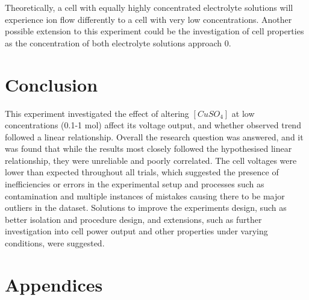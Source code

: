 \documentclass[10.5pt,a4paper]{article}
\begin{document}
Theoretically, a cell with equally highly concentrated electrolyte solutions will experience ion flow differently to a cell with very low concentrations. Another possible extension to this experiment could be the investigation of cell properties as the concentration of both electrolyte solutions approach $0$.
	




\section{Conclusion}
This experiment investigated the effect of altering $[CuSO_4]$ at low concentrations (0.1-1 mol) affect its voltage output, and whether observed trend followed a linear relationship.  Overall the research question was answered, and it was found that while the results most closely followed the hypothesised linear relationship, they were unreliable and poorly correlated. The cell voltages were lower than expected throughout all trials, which suggested the presence of inefficiencies or errors in the experimental setup and processes such as contamination and multiple instances of mistakes causing there to be major outliers in the dataset. Solutions to improve the experiments design, such as better isolation and procedure design, and extensions, such as further investigation into cell power output and other properties under varying conditions, were suggested.
\section*{Appendices}
\end{document}
